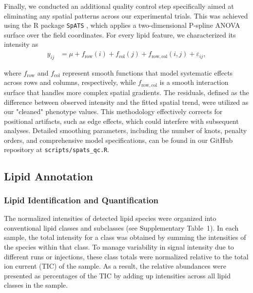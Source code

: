 \documentclass[10pt,letterpaper]{article}
\begin{document}
Finally, we conducted an additional quality control step specifically aimed at eliminating any  spatial patterns across our experimental trials. This was achieved using the R package \texttt{SpATS} \citep{Rodriguez-Alvarez2018}, which applies a two-dimensional P-spline ANOVA surface over the field coordinates. For every lipid feature, we characterized its intensity as
\begin{align}
  y_{ij} &= \mu + f_{\mathrm{row}}(i) + f_{\mathrm{col}}(j) + f_{\mathrm{row,col}}(i,j) + \varepsilon_{ij},
\end{align}

where \(f_{\mathrm{row}}\) and \(f_{\mathrm{col}}\) represent smooth functions that model systematic effects across rows and columns, respectively, while \(f_{\mathrm{row,col}}\) is a smooth interaction surface that handles more complex spatial gradients. The residuals, defined as the difference between observed intensity and the fitted spatial trend, were utilized as our "cleaned" phenotype values. This methodology effectively corrects for positional artifacts, such as edge effects, which could interfere with subsequent analyses. Detailed smoothing parameters, including the number of knots, penalty orders, and comprehensive model specifications, can be found in our GitHub repository at \texttt{scripts/spats\_qc.R}.

\subsection*{Lipid Annotation}

\subsubsection*{Lipid Identification and Quantification}
The normalized intensities of detected lipid species were organized into conventional lipid classes and subclasses (see Supplementary Table~1). In each sample, the total intensity for a class was obtained by summing the intensities of the species within that class. To manage variability in signal intensity due to different runs or injections, these class totals were normalized relative to the total ion current (TIC) of the sample. As a result, the relative abundances were presented as percentages of the TIC by adding up intensities across all lipid classes in the sample.
\end{document}
